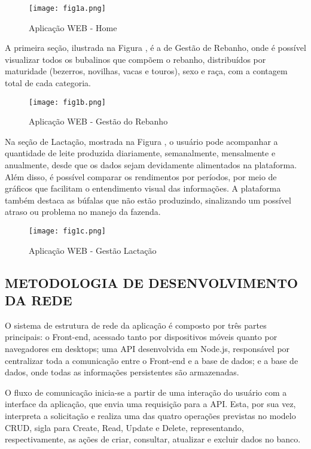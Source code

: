 \begin{figure}[!h]
\centering
\caption{Aplicação WEB - Home}%
\label{fig:01}
\texttt{[image: fig1a.png]}
\end{figure}

A primeira seção, ilustrada na Figura , é a de Gestão de Rebanho, onde é possível visualizar todos os bubalinos que compõem o rebanho, distribuídos por maturidade (bezerros, novilhas, vacas e touros), sexo e raça, com a contagem total de cada categoria.

\begin{figure}[!h]
\centering
\caption{Aplicação WEB - Gestão do Rebanho}%
\label{fig:02}
\texttt{[image: fig1b.png]}
\end{figure}

Na seção de Lactação, mostrada na Figura , o usuário pode acompanhar a quantidade de leite produzida diariamente, semanalmente, mensalmente e anualmente, desde que os dados sejam devidamente alimentados na plataforma. Além disso, é possível comparar os rendimentos por períodos, por meio de gráficos que facilitam o entendimento visual das informações. A plataforma também destaca as búfalas que não estão produzindo, sinalizando um possível atraso ou problema no manejo da fazenda.

\begin{figure}[!h]
\centering
\caption{Aplicação WEB - Gestão Lactação}%
\label{fig:03}
\texttt{[image: fig1c.png]}
\end{figure}

\subsection{METODOLOGIA DE DESENVOLVIMENTO DA REDE} 

O sistema de estrutura de rede da aplicação é composto por três partes principais: o Front-end, acessado tanto por dispositivos móveis quanto por navegadores em desktops; uma API desenvolvida em Node.js, responsável por centralizar toda a comunicação entre o Front-end e a base de dados; e a base de dados, onde todas as informações persistentes são armazenadas.

O fluxo de comunicação inicia-se a partir de uma interação do usuário com a interface da aplicação, que envia uma requisição para a API. Esta, por sua vez, interpreta a solicitação e realiza uma das quatro operações previstas no modelo CRUD, sigla para Create, Read, Update e Delete, representando, respectivamente, as ações de criar, consultar, atualizar e excluir dados no banco.

